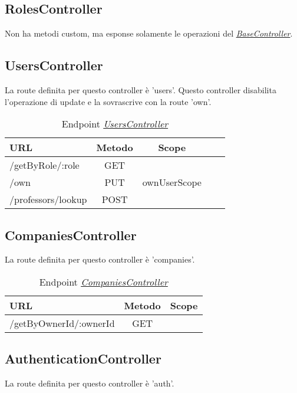 \subsection{RolesController}

Non ha metodi custom, ma esponse solamente le operazioni del \hyperref[server:base-controller]{\textit{BaseController}}.

\subsection{UsersController}
La route definita per questo controller è 'users'. Questo controller disabilita l'operazione di update e la sovrascrive con la route 'own'.

\label{server:users-controller}
\begin{table}[H]
	\ttfamily
	\caption{Endpoint \hyperref[server:users-controller]{\textit{UsersController}}}
	\centering
	\label{table:api:users-controller}
	\begin{tabular}{l c c c c}    
		URL  & Metodo & Scope \\ 
		\midrule
		/getByRole/:role & GET    \\
		/own & PUT & ownUserScope   \\
		/professors/lookup & POST   \\
		\bottomrule
	\end{tabular}
\end{table}

\subsection{CompaniesController}

La route definita per questo controller è 'companies'.

\label{server:companies-controller}
\begin{table}[H]
	\ttfamily
	\caption{Endpoint \hyperref[server:companies-controller]{\textit{CompaniesController}}}
	\centering
	\label{table:api:companies-controller}
	\begin{tabular}{l c c}    
		URL  & Metodo & Scope \\ 
		\midrule
		/getByOwnerId/:ownerId & GET    \\
		\bottomrule
	\end{tabular}
\end{table}

\subsection{AuthenticationController}
La route definita per questo controller è 'auth'.


